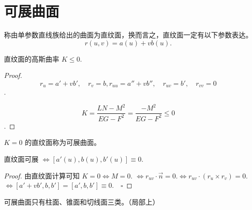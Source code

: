 \documentclass[lang=cn,10pt,thmcnt=section]{elegantbook}
\begin{document}
\section{可展曲面}

\begin{definition}[直纹面]
    称由单参数直线族给出的曲面为直纹面，换而言之，直纹面一定有以下参数表达。
\[
r(u,v) = a(u) + v b(u).
\]
\end{definition}
\begin{proposition}
    直纹面的高斯曲率 $K \leq 0$. 
\end{proposition}

\begin{proof}

    $$r_u = a' + v b', \quad r_v = b,r_{uu} = a'' + v b'', \quad r_{uv} = b', \quad r_{vv} = 0$$. 

$$K = \frac{LN - M^2}{EG - F^2} = \frac{-M^2}{EG - F^2} \leq 0$$.
\end{proof}
\begin{definition}[可展曲面]
    $K=0$ 的直纹面称为可展曲面。
\end{definition}
\begin{proposition}
    直纹面可展 $\Leftrightarrow [a'(u), b(u), b'(u)] \equiv 0$.
\end{proposition}
\begin{proof}
    由直纹面计算可知 $K=0 \Leftrightarrow M=0$. 
$\Leftrightarrow r_{uv} \cdot \overrightarrow{n} = 0. \Leftrightarrow r_{uv} \cdot (r_u \times r_v) = 0.$
$\Leftrightarrow [a' + vb', b, b'] = [a', b, b'] \equiv 0. \quad \square$
\end{proof}

\begin{proposition}
    可展曲面只有柱面、锥面和切线面三类。（局部上）
\end{proposition}
\end{document}
